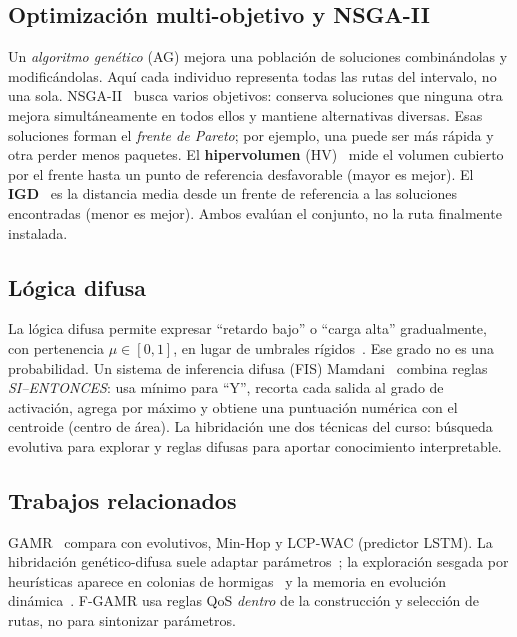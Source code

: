 \documentclass[conference]{IEEEtran}
\begin{document}
\subsection{Optimización multi-objetivo y NSGA-II}
Un \emph{algoritmo genético} (AG) mejora una población de soluciones combinándolas y modificándolas. Aquí cada individuo representa todas las rutas del intervalo, no una sola. NSGA-II~\cite{deb2002nsga2} busca varios objetivos: conserva soluciones que ninguna otra mejora simultáneamente en todos ellos y mantiene alternativas diversas. Esas soluciones forman el \emph{frente de Pareto}; por ejemplo, una puede ser más rápida y otra perder menos paquetes. El \textbf{hipervolumen} (HV)~\cite{zitzler1999hv} mide el volumen cubierto por el frente hasta un punto de referencia desfavorable (mayor es mejor). El \textbf{IGD}~\cite{coello2004igd} es la distancia media desde un frente de referencia a las soluciones encontradas (menor es mejor). Ambos evalúan el conjunto, no la ruta finalmente instalada.

\subsection{Lógica difusa}
La lógica difusa permite expresar ``retardo bajo'' o ``carga alta'' gradualmente, con pertenencia $\mu\in[0,1]$, en lugar de umbrales rígidos~\cite{zadeh1965fuzzy}. Ese grado no es una probabilidad. Un sistema de inferencia difusa (FIS) Mamdani~\cite{mamdani1975} combina reglas \emph{SI--ENTONCES}: usa mínimo para ``Y'', recorta cada salida al grado de activación, agrega por máximo y obtiene una puntuación numérica con el centroide (centro de área). La hibridación une dos técnicas del curso: búsqueda evolutiva para explorar y reglas difusas para aportar conocimiento interpretable.

\subsection{Trabajos relacionados}
GAMR~\cite{tran2025gamr} compara con evolutivos, Min-Hop y LCP-WAC (predictor LSTM). La hibridación genético-difusa suele adaptar parámetros~\cite{herrera2003fuzzyga}; la exploración sesgada por heurísticas aparece en colonias de hormigas~\cite{dorigo2004aco} y la memoria en evolución dinámica~\cite{nguyen2012dynamic}. F-GAMR usa reglas QoS \emph{dentro} de la construcción y selección de rutas, no para sintonizar parámetros.
\end{document}
